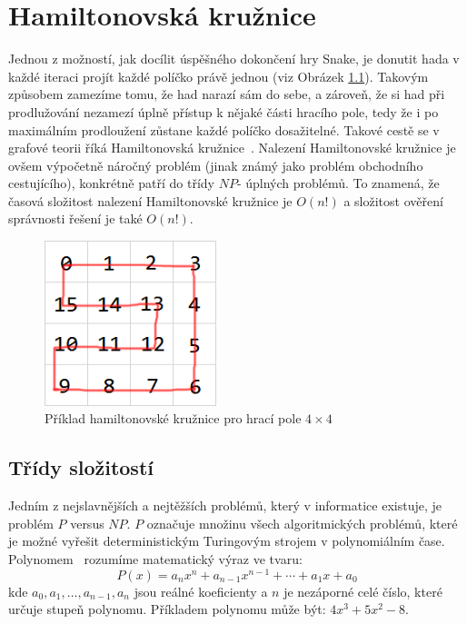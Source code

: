 \chapter{Hamiltonovská kružnice}\label{Hamiltonovská kružnice}

Jednou z možností, jak docílit úspěšného dokončení hry Snake, je donutit hada v každé iteraci projít každé políčko právě jednou (viz Obrázek \ref{fig:Hamiltonian_cycle_example}). Takovým způsobem zamezíme tomu, že had narazí sám do sebe, a zároveň, že si had při prodlužování nezamezí úplně přístup k nějaké části hracího pole, tedy že i po maximálním prodloužení zůstane každé políčko dosažitelné. Takové cestě se v grafové teorii říká Hamiltonovská kružnice~\cite{HamiltonianCycleGFG}. Nalezení Hamiltonovské kružnice je ovšem výpočetně náročný problém (jinak známý jako problém obchodního cestujícího), konkrétně patří do třídy \(NP\)- úplných problémů. To znamená, že časová složitost nalezení Hamiltonovské kružnice je \(O(n!)\) a složitost ověření správnosti řešení je také \(O(n!)\).

\begin{figure}[!ht]
    \centering
    \includegraphics[width = 5cm]{Images/Hamiltonian_cycle_examle.png}
    \caption[Dostupné z: \url{https://gamedev.stackexchange.com/questions/133460/how-to-find-a-safe-path-for-an-ai-snake}]{Příklad hamiltonovské kružnice pro hrací pole \(4 \times 4\)}
    \label{fig:Hamiltonian_cycle_example}
\end{figure}

\section{Třídy složitostí}
Jedním z nejslavnějších a nejtěžších problémů, který v informatice existuje, je problém \(P\) versus \(NP\). \(P\) označuje množinu všech algoritmických problémů, které je možné vyřešit deterministickým Turingovým strojem v polynomiálním čase. Polynomem~\cite{MathTutorFunctions2025} rozumíme matematický výraz ve tvaru:
\[
P(x) = a_n x^n + a_{n-1} x^{n-1} + \cdots + a_1 x + a_0
\]
kde \(a_0, a_1, \dots, a_{n-1}, a_n\) jsou reálné koeficienty a \(n\) je nezáporné celé číslo, které určuje stupeň polynomu. Příkladem polynomu může být: \(4x^3 + 5x^2 - 8\). 

